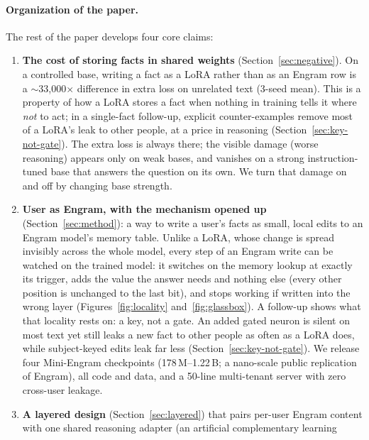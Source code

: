 \documentclass[11pt]{article}
\begin{document}
\paragraph{Organization of the paper.}
The rest of the paper develops four core claims:
\begin{enumerate}[leftmargin=*,topsep=2pt,itemsep=2pt]
  \item \textbf{The cost of storing facts in shared weights}
        (Section~\ref{sec:negative}).
        On a controlled base, writing a fact as a LoRA rather than as
        an Engram row is a $\sim$33{,}000$\times$ difference in extra
        loss on unrelated text (3-seed mean). This is a property of how a
        LoRA stores a fact when nothing in training tells it where
        \emph{not} to act; in a single-fact follow-up, explicit
        counter-examples remove most of a LoRA's leak to other people,
        at a price in reasoning (Section~\ref{sec:key-not-gate}). The extra loss is
        always there; the visible damage (worse reasoning) appears
        only on weak bases, and vanishes on a strong instruction-tuned
        base that answers the question on its own. We turn that damage
        on and off by changing base strength.
  \item \textbf{User as Engram, with the mechanism opened up}
        (Section~\ref{sec:method}):
        a way to write a user's facts as small, local edits to an
        Engram model's memory table. Unlike a LoRA, whose change is
        spread invisibly across the whole model, every step of an
        Engram write can be watched on the trained model: it switches
        on the memory lookup at exactly its trigger, adds the value
        the answer needs and nothing else (every other position is
        unchanged to the last bit), and stops working if written into
        the wrong layer (Figures~\ref{fig:locality} and~\ref{fig:glassbox}).
        A follow-up shows what that locality rests on: a key, not a
        gate. An added gated neuron is silent on most text yet still
        leaks a new fact to other people as often as a LoRA does, while
        subject-keyed edits leak far less
        (Section~\ref{sec:key-not-gate}).
        We release four Mini-Engram checkpoints
        (178\,M--1.22\,B; a nano-scale public replication of
        Engram), all code and data, and a 50-line multi-tenant
        server with zero cross-user leakage.
  \item \textbf{A layered design} (Section~\ref{sec:layered})
        that pairs per-user Engram content with one shared
        reasoning adapter (an artificial complementary learning

\end{enumerate}
\end{document}
